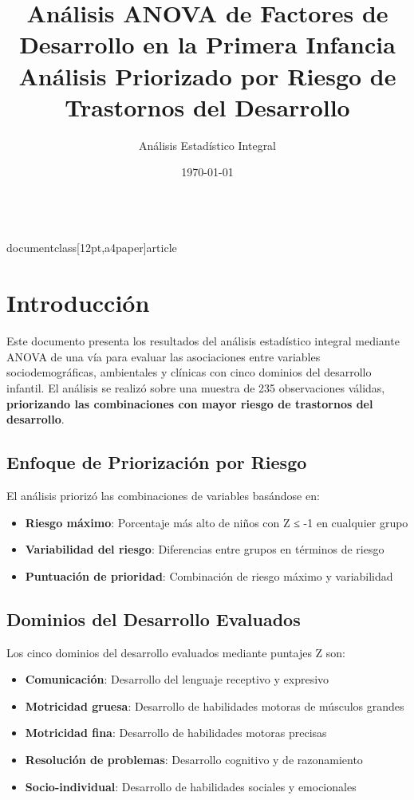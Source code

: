 \\documentclass[12pt,a4paper]{article}
\title{Análisis ANOVA de Factores de Desarrollo en la Primera Infancia\\
\large{Análisis Priorizado por Riesgo de Trastornos del Desarrollo}}
\author{Análisis Estadístico Integral}
\date{\today}
\begin{document}
\maketitle

\section{Introducción}

Este documento presenta los resultados del análisis estadístico integral mediante ANOVA de una vía para evaluar las asociaciones entre variables sociodemográficas, ambientales y clínicas con cinco dominios del desarrollo infantil. El análisis se realizó sobre una muestra de 235 observaciones válidas, \textbf{priorizando las combinaciones con mayor riesgo de trastornos del desarrollo}.

\subsection{Enfoque de Priorización por Riesgo}

El análisis priorizó las combinaciones de variables basándose en:
\begin{itemize}
\item \textbf{Riesgo máximo}: Porcentaje más alto de niños con Z ≤ -1 en cualquier grupo
\item \textbf{Variabilidad del riesgo}: Diferencias entre grupos en términos de riesgo
\item \textbf{Puntuación de prioridad}: Combinación de riesgo máximo y variabilidad
\end{itemize}

\subsection{Dominios del Desarrollo Evaluados}

Los cinco dominios del desarrollo evaluados mediante puntajes Z son:

\begin{itemize}
\item \textbf{Comunicación}: Desarrollo del lenguaje receptivo y expresivo
\item \textbf{Motricidad gruesa}: Desarrollo de habilidades motoras de músculos grandes
\item \textbf{Motricidad fina}: Desarrollo de habilidades motoras precisas
\item \textbf{Resolución de problemas}: Desarrollo cognitivo y de razonamiento
\item \textbf{Socio-individual}: Desarrollo de habilidades sociales y emocionales
\end{itemize}
\end{document}
